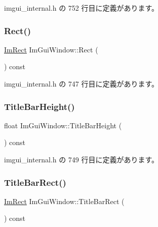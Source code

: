  imgui\+\_\+internal.\+h の 752 行目に定義があります。

\mbox{\label{struct_im_gui_window_a147da28bf5d167cbe0a363c4a578dea1}} 
\subsubsection{\texorpdfstring{Rect()}{Rect()}}
{\footnotesize\ttfamily \mbox{\hyperlink{struct_im_rect}{Im\+Rect}} Im\+Gui\+Window\+::\+Rect (\begin{DoxyParamCaption}{ }\end{DoxyParamCaption}) const\hspace{0.3cm}{\ttfamily [inline]}}



 imgui\+\_\+internal.\+h の 747 行目に定義があります。

\mbox{\label{struct_im_gui_window_ad1580cc8b5bdf981c6ed2eb22ecd7dbb}} 
\subsubsection{\texorpdfstring{Title\+Bar\+Height()}{TitleBarHeight()}}
{\footnotesize\ttfamily float Im\+Gui\+Window\+::\+Title\+Bar\+Height (\begin{DoxyParamCaption}{ }\end{DoxyParamCaption}) const\hspace{0.3cm}{\ttfamily [inline]}}



 imgui\+\_\+internal.\+h の 749 行目に定義があります。

\mbox{\label{struct_im_gui_window_a06884e1bc80e460e51e1626b5b976196}} 
\subsubsection{\texorpdfstring{Title\+Bar\+Rect()}{TitleBarRect()}}
{\footnotesize\ttfamily \mbox{\hyperlink{struct_im_rect}{Im\+Rect}} Im\+Gui\+Window\+::\+Title\+Bar\+Rect (\begin{DoxyParamCaption}{ }\end{DoxyParamCaption}) const\hspace{0.3cm}{\ttfamily [inline]}}



